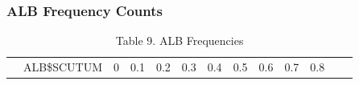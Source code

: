 \subsubsection{ALB Frequency Counts}\label{alb-frequency-counts}

\begin{Shaded}
\begin{Highlighting}[]
\NormalTok{(} \NormalTok{, } \NormalTok{)}
\end{Highlighting}
\end{Shaded}

\begin{longtable}[]{@{}lcccccccccccc@{}}
\caption{Table 9. ALB Frequencies}\tabularnewline
\toprule
\begin{minipage}[t]{0.10\columnwidth}\raggedright\strut
\strut
\end{minipage} & \begin{minipage}[t]{0.10\columnwidth}\centering\strut
ALB\$SCUTUM\strut
\end{minipage} & \begin{minipage}[t]{0.04\columnwidth}\centering\strut
0\strut
\end{minipage} & \begin{minipage}[t]{0.04\columnwidth}\centering\strut
0.1\strut
\end{minipage} & \begin{minipage}[t]{0.04\columnwidth}\centering\strut
0.2\strut
\end{minipage} & \begin{minipage}[t]{0.04\columnwidth}\centering\strut
0.3\strut
\end{minipage} & \begin{minipage}[t]{0.04\columnwidth}\centering\strut
0.4\strut
\end{minipage} & \begin{minipage}[t]{0.04\columnwidth}\centering\strut
0.5\strut
\end{minipage} & \begin{minipage}[t]{0.04\columnwidth}\centering\strut
0.6\strut
\end{minipage} & \begin{minipage}[t]{0.04\columnwidth}\centering\strut
0.7\strut
\end{minipage} & \begin{minipage}[t]{0.04\columnwidth}\centering\strut
0.8\strut

\end{minipage}
\end{longtable}

